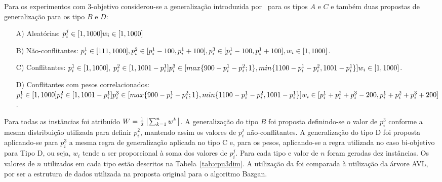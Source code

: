 Para os experimentos com $3$-objetivo considerou-se
a generalização introduzida por~\cite{bazgan2009}
para os tipos $A$ e $C$ e também duas propostas de generalização
para os tipo $B$ e $D$:
\begin{enumerate}
  \item[A)] Aleatórias: $
    p^j_i \in [1, 1000]\\
    w_i \in [1,1000]$
  \item[B)] Não-conflitantes: $
    p^1_i \in [111, 1000],\\
    p^2_i \in [p^1_i - 100, p^1_i + 100],\\
    p^3_i \in [p^1_i - 100, p^1_i + 100],\\
    w_i \in [1,1000]$.
  \item[C)] Conflitantes: $
    p^1_i \in [1, 1000], \;
    p^2_i \in [1, 1001 - p^1_i] \\
    p^3_i \in [max\{900-p^1_i-p^2_i;1\}, min\{1100-p^1_i-p^2_i, 1001-p^1_i\}]\\
    w_i \in [1,1000]$.
  \item[D)] Conflitantes com pesos correlacionados: $
    p^1_i \in [1, 1000]\\
    p^2_i \in [1, 1001 - p^1_i] \\
    p^3_i \in [max\{900-p^1_i-p^2_i;1\}, min\{1100-p^1_i-p^2_i, 1001-p^1_i\}]\\
    w_i \in [p^1_i+p^2_i+p^3_i-200, p^1_i+p^2_i+p^3_i+200]$.
\end{enumerate}


Para todas as instâncias foi atribuído $W=\frac{1}{2}\left \lfloor{\sum^n_{k=1} w^k}\right \rfloor$.
A generalização do tipo $B$ foi proposta definindo-se o valor de $p^3_i$ conforme
a mesma distribuição utilizada para definir $p^2_i$,
mantendo assim os valores de $p^j_i$ não-conflitantes.
A generalização do tipo D foi proposta aplicando-se para $p^3_i$ a mesma regra de generalização
aplicada no tipo C e, para os pesos, aplicando-se a regra utilizada no caso bi-objetivo para Tipo D,
ou seja, $w_i$ tende a ser proporcional à soma dos valores de $p^j_i$.
Para cada tipo e valor de $n$ foram geradas dez instâncias.
Os valores de $n$ utilizados em cada tipo estão descritos na Tabela~\ref{tab:cpu3dim}.
A utilização da \kdtree{} foi comparada à utilização da árvore AVL,
por ser a estrutura de dados utilizada na proposta original para o algoritmo Bazgan.

